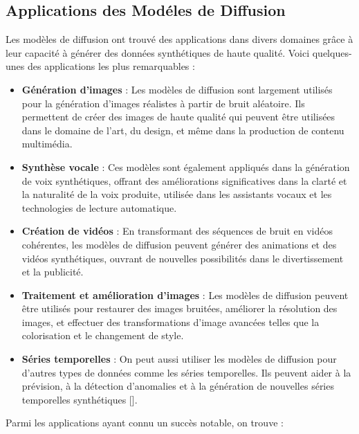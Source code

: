\subsection{Applications des Modéles de Diffusion}
Les modèles de diffusion ont trouvé des applications dans divers domaines grâce
à leur capacité à générer des données synthétiques de haute qualité. Voici
quelques-unes des applications les plus remarquables :

\begin{itemize}
	\item \textbf{Génération d'images} : Les modèles de diffusion sont largement utilisés pour la génération d'images réalistes à partir de bruit aléatoire. Ils permettent de créer des images de haute qualité qui peuvent être utilisées dans le domaine de l'art, du design, et même dans la production de contenu multimédia.

	\item \textbf{Synthèse vocale} : Ces modèles sont également appliqués dans la génération de voix synthétiques, offrant des améliorations significatives dans la clarté et la naturalité de la voix produite, utilisée dans les assistants vocaux et les technologies de lecture automatique.

	\item \textbf{Création de vidéos} : En transformant des séquences de bruit en vidéos cohérentes, les modèles de diffusion peuvent générer des animations et des vidéos synthétiques, ouvrant de nouvelles possibilités dans le divertissement et la publicité.

	\item \textbf{Traitement et amélioration d'images} : Les modèles de diffusion peuvent être utilisés pour restaurer des images bruitées, améliorer la résolution des images, et effectuer des transformations d'image avancées telles que la colorisation et le changement de style.

	\item \textbf{Séries temporelles} : On peut aussi utiliser les modèles de diffusion pour d'autres types de données comme les séries temporelles. Ils peuvent aider à la prévision, à la détection d'anomalies et à la génération de nouvelles séries temporelles synthétiques [\cite{yang2023survey}].
\end{itemize}

Parmi les applications ayant connu un succès notable, on trouve :

